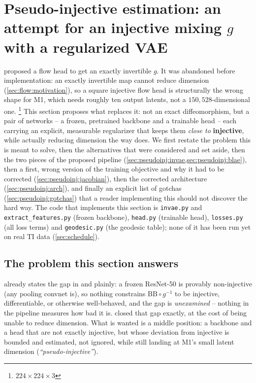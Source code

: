 \section{Pseudo-injective estimation: an attempt for an injective mixing 
\texorpdfstring{$g$}{g} with a regularized VAE}
\label{sec:pseudoinj}

 proposed a flow head to get an exactly invertible $g$.
It was abandoned before implementation: an exactly invertible map cannot reduce dimension
(\cref{sec:flow:motivation}), so a square injective flow head is structurally the wrong shape for M1, 
which needs roughly ten output latents, not a $150{,}528$-dimensional one.
\footnote{$224\times224\times3$} 
This section proposes what replaces it: not an exact diffeomorphism, but a pair of networks -- a 
frozen, pretrained backbone and a 
trainable head -- each carrying an explicit, measurable regularizer that keeps them \emph{close to} 
\textbf{injective}, while actually reducing dimension the way  does. 
We first restate the problem this is meant to solve, then the alternatives that were considered and set 
aside, then the two pieces of the proposed pipeline (\cref{sec:pseudoinj:invae,sec:pseudoinj:blae}), 
then a first, wrong version of the
training objective and why it had to be corrected (\cref{sec:pseudoinj:jacobian}), then the corrected
architecture (\cref{sec:pseudoinj:arch}), and finally an explicit list of gotchas
(\cref{sec:pseudoinj:gotchas}) that a reader implementing this should not discover the hard way.
The code that implements this section is \texttt{invae.py} and \texttt{extract\_features.py} (frozen
backbone), \texttt{head.py} (trainable head), \texttt{losses.py} (all loss terms) and
\texttt{geodesic.py} (the geodesic table); none of it has been run yet on real TI data
(\cref{sec:schedule}).

\subsection{The problem this section answers}
\label{sec:pseudoinj:problem}
 already states the gap in  and  plainly: a frozen ResNet-50 is
provably non-injective (any pooling convnet is), so nothing constrains $\mathrm{BB}\circ g^{-1}$ to be
injective, differentiable, or otherwise well-behaved, and the gap is \emph{unexamined} -- nothing in the
pipeline measures how bad it is.  closed that gap exactly, at the cost of being unable to
reduce dimension. What is wanted is a middle position: a backbone and a head that are not exactly
injective, but whose deviation from injective is bounded and estimated, not ignored, while still landing
at M1's small latent dimension (\emph{``pseudo-injective''}).

